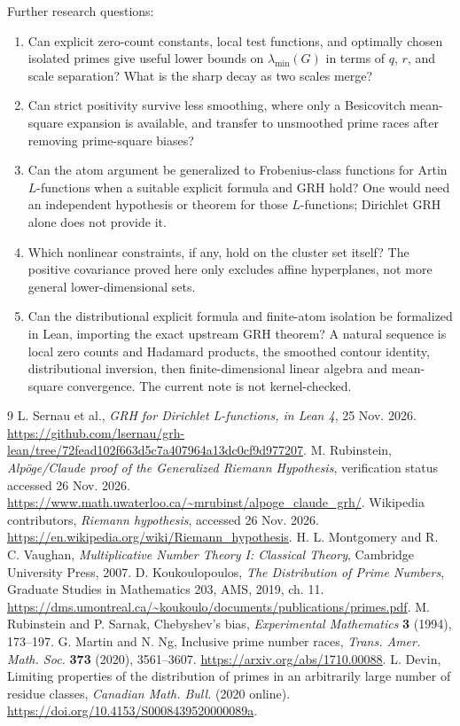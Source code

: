 \documentclass[11pt]{article}
\theoremstyle{remark}\newtheorem{remark}[theorem]{Remark}
\begin{document}
Further research questions:
\begin{enumerate}
\item Can explicit zero-count constants, local test functions, and optimally chosen isolated primes give useful lower bounds on $\lambda_{\min}(G)$ in terms of $q$, $r$, and scale separation? What is the sharp decay as two scales merge?
\item Can strict positivity survive less smoothing, where only a Besicovitch mean-square expansion is available, and transfer to unsmoothed prime races after removing prime-square biases?
\item Can the atom argument be generalized to Frobenius-class functions for Artin $L$-functions when a suitable explicit formula and GRH hold? One would need an independent hypothesis or theorem for those $L$-functions; Dirichlet GRH alone does not provide it.
\item Which nonlinear constraints, if any, hold on the cluster set itself? The positive covariance proved here only excludes affine hyperplanes, not more general lower-dimensional sets.
\item Can the distributional explicit formula and finite-atom isolation be formalized in Lean, importing the exact upstream GRH theorem? A natural sequence is local zero counts and Hadamard products, the smoothed contour identity, distributional inversion, then finite-dimensional linear algebra and mean-square convergence. The current note is not kernel-checked.
\end{enumerate}

\begin{thebibliography}{9}
 L. Sernau et al., \emph{GRH for Dirichlet L-functions, in Lean 4}, 25 Nov. 2026. \url{https://github.com/lsernau/grh-lean/tree/72fead102f663d5c7a407964a13dc0cf9d977207}.
 M. Rubinstein, \emph{Alp\"oge/Claude proof of the Generalized Riemann Hypothesis}, verification status accessed 26 Nov. 2026. \url{https://www.math.uwaterloo.ca/~mrubinst/alpoge_claude_grh/}.
 Wikipedia contributors, \emph{Riemann hypothesis}, accessed 26 Nov. 2026. \url{https://en.wikipedia.org/wiki/Riemann_hypothesis}.
 H. L. Montgomery and R. C. Vaughan, \emph{Multiplicative Number Theory I: Classical Theory}, Cambridge University Press, 2007.
 D. Koukoulopoulos, \emph{The Distribution of Prime Numbers}, Graduate Studies in Mathematics 203, AMS, 2019, ch. 11. \url{https://dms.umontreal.ca/~koukoulo/documents/publications/primes.pdf}.
 M. Rubinstein and P. Sarnak, Chebyshev's bias, \emph{Experimental Mathematics} \textbf{3} (1994), 173--197.
 G. Martin and N. Ng, Inclusive prime number races, \emph{Trans. Amer. Math. Soc.} \textbf{373} (2020), 3561--3607. \url{https://arxiv.org/abs/1710.00088}.
 L. Devin, Limiting properties of the distribution of primes in an arbitrarily large number of residue classes, \emph{Canadian Math. Bull.} (2020 online). \url{https://doi.org/10.4153/S0008439520000089a}.
\end{thebibliography}
\end{document}
